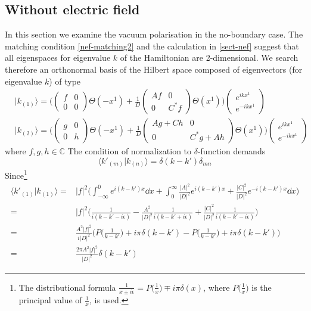 \subsection{Without electric field}\label{sect-nbnef}
In this section we examine the vacuum polarisation in the no-boundary case.
The matching condition \cref{nef-matching2} and the calculation in \cref{sect-nef} suggest that all eigenspaces for eigenvalue $k$ of the Hamiltonian are 2-dimensional. We search therefore an orthonormal basis of the Hilbert space composed of eigenvectors (for eigenvalue $k$) of type
\begin{equation}
\begin{split}
& | k_{(1)} \rangle = \bigg( \begin{pmatrix} f & 0 \\ 0 & 0 \end{pmatrix}
\Theta(-x^1) + 
\frac{1}{D}\begin{pmatrix} Af & 0 \\  0 & C^* f \end{pmatrix} \Theta(x^1) \bigg)
\begin{pmatrix} e^{ikx^1}  \\ e^{-ikx^1} \end{pmatrix}   \\
& | k_{(2)} \rangle = \bigg( \begin{pmatrix} g& 0 \\ 0 & h \end{pmatrix}
\Theta(-x^1) + 
\frac{1}{D}\begin{pmatrix} Ag + Ch  & 0\\ 0&  C^*g + Ah  \end{pmatrix} \Theta(x^1) \bigg)
\begin{pmatrix} e^{ikx^1}  \\  e^{-ikx^1}  \end{pmatrix}  
\end{split}
\end{equation}
where $f,g,h \in \mathbb{C}$
The condition of normalization to $\delta$-function demands
\begin{equation}
\langle k'_{(m)} | k_{(n)} \rangle = \delta(k - k') \delta_{mn}
\end{equation}
Since\footnote{
The distributional formula $\frac{1}{x \pm i\epsilon} = P\big(\frac{1}{x}\big) \mp i\pi\delta(x)$, where $P\big(\frac{1}{x}\big)$ is the principal value of $\frac{1}{x}$, is used.}
\begin{equation}
\begin{split}
\langle k'_{(1)} | k_{(1)} \rangle = & |f|^2 \bigg( \int_{-\infty}^0 e^{i(k - k')x} \dd x + \int_0^{\infty}\frac{|A|^2}{|D|^2} e^{i(k-k')x} + \frac{|C|^2}{|D|^2} e^{-i(k - k')x} \dd x \bigg) \\
= & |f|^2 \bigg( \frac{1}{i(k-k' - i\epsilon)} - \frac{A^2}{|D|^2}\frac{1}{i(k-k'+i\epsilon)} + \frac{|C|^2}{|D|^2}\frac{1}{i(k-k'-i\epsilon)} \bigg) \\
= & \frac{A^2 |f|^2}{i |D|^2}\Big( P\big(\frac{1}{k-k'}\big) + i\pi \delta(k-k') - P\big(\frac{1}{k-k'}\big) + i\pi \delta(k-k') \Big) \\
= & \frac{2\pi A^2 |f|^2}{|D|^2} \delta(k-k')
\end{split}
\end{equation}
